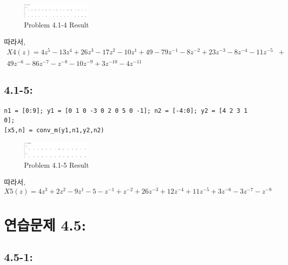 \documentclass[11pt
  , a4paper
  , article
  , oneside
]{memoir}
\begin{document}
\begin{figure}[h!]
	\centering
	\includegraphics[width=0.3\textwidth,height=0.15\textwidth]{./images/p401-4.png}
	\caption{Problem 4.1-4 Result}
	\label{fig:Problem 4.1-4 Result}
\end{figure}

따라서, 
\begin {equation}
\begin {split}
X4(z)= 4z^5 - 13z^4 + 26z^3 - 17z^2 -10z^1 + 49 -79z^{-1} - 8z^{-2} +23z^{-3} - 8z^{-4} -11z^{-5}  &+\\ 49z^{-6} -86z^{-7} -z^{-8} -10z^{-9} +3z^{-10} -4z^{-11}
\end{split}
\end {equation}

\section{4.1-5: }
\begin{lstlisting}[style=termstyle]
n1 = [0:9]; y1 = [0 1 0 -3 0 2 0 5 0 -1]; n2 = [-4:0]; y2 = [4 2 3 1 0];
[x5,n] = conv_m(y1,n1,y2,n2)
\end{lstlisting}

\begin{figure}[h!]
	\centering
	\includegraphics[width=0.3\textwidth,height=0.15\textwidth]{./images/p401-5.png}
	\caption{Problem 4.1-5 Result}
	\label{fig:Problem 4.1-5 Result}
\end{figure}
따라서, 
\begin {equation}
X5(z)= 4z^3 + 2z^2 - 9z^1 -5 -z^{-1} + z^{-2} +26z^{-3}+12z^{-4}+11z^{-5}+3z^{-6}-3z^{-7}-z^{-8}
\end {equation}

\clearpage

\chapter{연습문제 4.5: }
\section{4.5-1: }
\end{document}
